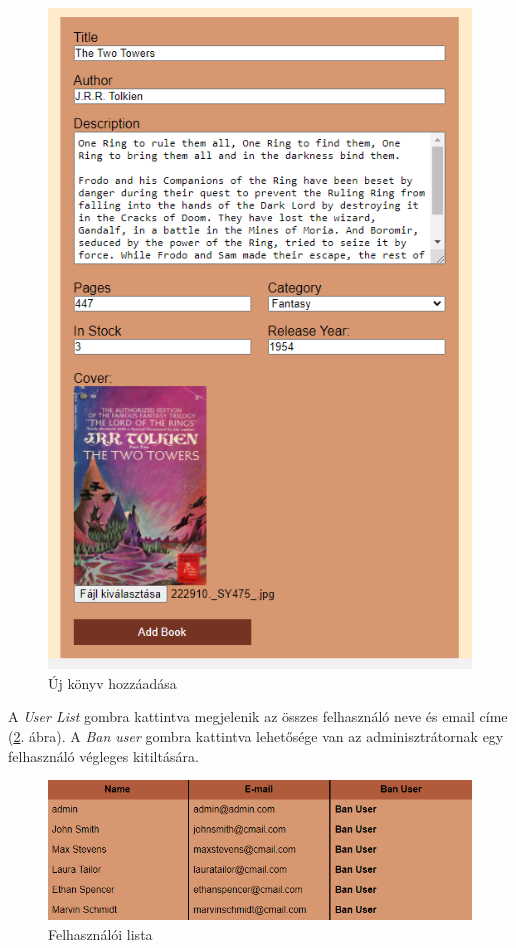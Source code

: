 \begin{figure}[h]
    \centering
    \includegraphics[scale=0.7]{images/application/newbook.png}
    \caption{Új könyv hozzáadása}
    \label{fig:newbook}
\end{figure}

A \textit{User List} gombra kattintva megjelenik az összes felhasználó neve és email címe (\ref{fig:userlist}. ábra). A \textit{Ban user} gombra kattintva lehetősége van az adminisztrátornak egy felhasználó végleges kitiltására.

\begin{figure}[h]
    \centering
    \includegraphics[scale=0.7]{images/application/userlist.png}
    \caption{Felhasználói lista}
    \label{fig:userlist}
\end{figure}

